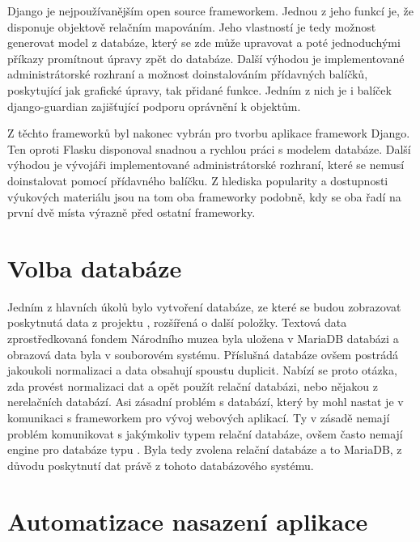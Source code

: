Django je nejpoužívanějším open source frameworkem. Jednou z jeho funkcí je, že
disponuje objektově relačním mapováním. Jeho vlastností je tedy možnost generovat
model z databáze, který se zde může upravovat a poté jednoduchými
příkazy promítnout úpravy zpět do databáze. Další výhodou je implementované
administrátorské rozhraní a možnost doinstalováním přídavných balíčků,
poskytující jak grafické úpravy, tak přidané funkce. Jedním z nich je
i balíček django-guardian zajišťující podporu oprávnění k objektům. \cite{django}


Z těchto frameworků byl nakonec vybrán pro tvorbu aplikace framework
Django. Ten oproti Flasku disponoval snadnou a rychlou práci s modelem
databáze. Další výhodou je vývojáři implementované administrátorské
rozhraní, které se nemusí doinstalovat pomocí přídavného balíčku. Z
hlediska popularity a dostupnosti výuko\-vých materiálu jsou na tom oba
frameworky podobně, kdy se oba řadí na první dvě místa výrazně před
ostatní frameworky.

\vspace{10px}

\section{Volba databáze}

Jedním z hlavních úkolů bylo vytvoření databáze, ze které se budou
zobrazovat poskytnutá data z projektu , rozšířená o další
položky. Textová data zprostředkovaná fondem Národního muzea byla uložena v
MariaDB databázi a obrazová data byla v souborovém systému. Příslušná
databáze ovšem postrádá jakoukoli norma\-lizaci a data obsahují spoustu
duplicit. Nabízí se proto otázka, zda provést norma\-lizaci dat a opět
použít relační databázi, nebo nějakou z nerelačních
databází. Asi zásadní problém s  databází, který by mohl nastat
je v komunikaci s frameworkem pro vývoj webových aplikací. Ty
v zásadě nemají problém komunikovat s jakýmkoliv typem relační
databáze, ovšem často nemají engine pro databáze typu . Byla 
tedy zvolena relační databáze a to MariaDB, z důvodu poskytnutí dat právě
z tohoto databázového systému. \cite{django} \cite{mariadb}

\newpage

\section{Automatizace nasazení aplikace}


